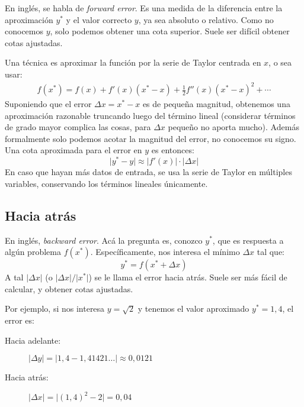   En inglés,
  se habla de \emph{\foreignlanguage{english}{forward error}}.
  Es una medida de la diferencia entre la aproximación \(y^*\)
  y el valor correcto \(y\),
  ya sea absoluto o relativo.
  Como no conocemos \(y\),
  solo podemos obtener una cota superior.
  Suele ser difícil obtener cotas ajustadas.

  Una técnica es aproximar la función por la serie de Taylor
  centrada en \(x\),
  o sea usar:
  \begin{align*}
    f(x^*)
      = f(x) + f'(x) (x^* - x) + \frac{1}{2} f''(x) (x^* - x)^2 + \dotsb
  \end{align*}
  Suponiendo que el error \(\Delta x = x^* - x\) es de pequeña magnitud,
  obtenemos una aproximación razonable truncando luego del término lineal
  (considerar términos de grado mayor
   complica las cosas,
   para \(\Delta x\) pequeño no aporta mucho).
  Además formalmente solo podemos acotar la magnitud del error,
  no conocemos su signo.
  Una cota aproximada para el error en \(y\) es entonces:
  \begin{equation*}
    \lvert y^* - y \rvert
      \approx \lvert f'(x) \rvert \cdot \lvert \Delta x \rvert
  \end{equation*}
  En caso que hayan más datos de entrada,
  se usa la serie de Taylor en múltiples variables,
  conservando los términos lineales únicamente.

\subsection{Hacia atrás}
\label{sec:error-atras}

  En inglés,
  \emph{\foreignlanguage{english}{backward error}}.
  Acá la pregunta es,
  conozco \(y^*\),
  que es respuesta a algún problema \(f(x^*)\).
  Específicamente,
  nos interesa el mínimo \(\Delta x\) tal que:
  \begin{equation*}
    y^*
      = f(x^* + \Delta x)
  \end{equation*}
  A tal \(\lvert \Delta x \rvert\)
  (o \(\lvert \Delta x \rvert / \lvert x^* \rvert\))
  se le llama el error hacia atrás.
  Suele ser más fácil de calcular,
  y obtener cotas ajustadas.

  Por ejemplo,
  si nos interesa \(y = \sqrt{2}\) y tenemos el valor aproximado \(y^* = 1,4\),
  el error es:
  \begin{description}
  \item[Hacia adelante:]
    \(\lvert \Delta y \rvert
        = \lvert 1,4 - 1,41421\ldots \rvert
        \approx 0,0121\)
  \item[Hacia atrás:]
    \(\lvert \Delta x \rvert
        = \lvert (1,4)^2 - 2 \rvert
        = 0,04\)
  \end{description}

